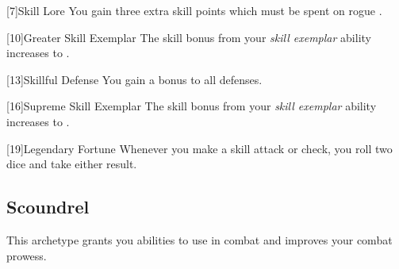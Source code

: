        [7]{Skill Lore} You gain three extra skill points which must be spent on rogue .

        [10]{Greater Skill Exemplar} The skill bonus from your \textit{skill exemplar} ability increases to .

        [13]{Skillful Defense} You gain a  bonus to all defenses.

        [16]{Supreme Skill Exemplar} The skill bonus from your \textit{skill exemplar} ability increases to .

        [19]{Legendary Fortune} Whenever you make a skill attack or check, you roll two dice and take either result.

    \subsection{Scoundrel}
        This archetype grants you abilities to use in combat and improves your combat prowess.

